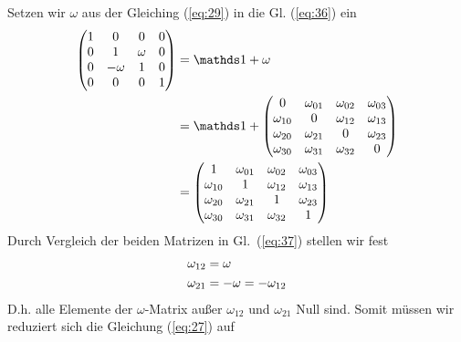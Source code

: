 Setzen wir \(\omega\) aus der Gleiching (\ref{eq:29}) in die Gl. (\ref{eq:36}) ein
\begin{align}
  \label{eq:37}
  \begin{pmatrix}
1&0&0&0\\
0&1&\omega&0\\
0&-\omega&1&0\\
0&0&0&1
\end{pmatrix} &= \mathds 1 + \omega\notag\\
&=\mathds 1+
  \begin{pmatrix}0&\omega_{01}&\omega_{02}&\omega_{03}\\ \omega_{10}&0&\omega_{12}&\omega_{13}\\\omega_{20}&\omega_{21}&0&\omega_{23}\\ \omega_{30}&\omega_{31}&\omega_{32}&0\end{pmatrix}\notag\\
&= \begin{pmatrix}1&\omega_{01}&\omega_{02}&\omega_{03}\\ \omega_{10}&1&\omega_{12}&\omega_{13}\\\omega_{20}&\omega_{21}&1&\omega_{23}\\ \omega_{30}&\omega_{31}&\omega_{32}&1\end{pmatrix} 
\end{align}
Durch Vergleich der beiden Matrizen in Gl.~(\ref{eq:37}) stellen wir fest
\begin{align}
  \label{eq:38}
  \omega_{12}&=\omega\notag\\
  \omega_{21}&=-\omega=-\omega_{12}
\end{align}
D.h. alle Elemente der \(\omega\)-Matrix außer \(\omega_{12}\) und \(\omega_{21}\) Null sind. Somit müssen wir reduziert sich die Gleichung (\ref{eq:27}) auf


